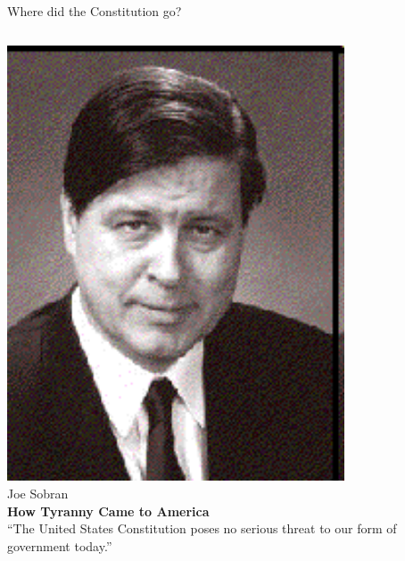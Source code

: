 \begin{frame}{Where did the Constitution go?}
    \begin{columns}[onlytextwidth]
            \centering
            \includegraphics[width=0.75\textwidth]{img/joe-sobran.png} \\
            Joe Sobran \\

            \textbf{How Tyranny Came to America} \\
            \vspace{20pt}
            {\large
                ``The United States Constitution poses no serious threat to our form of government today.''
            }

    \end{columns}
\end{frame}

